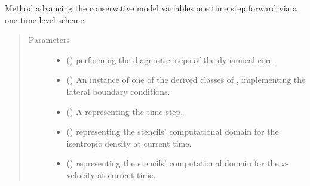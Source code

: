 \documentclass[letterpaper,10pt,english]{sphinxmanual}
\begin{document}
\begin{fulllineitems}
\begin{fulllineitems}
\end{fulllineitems}


\begin{fulllineitems}
\label{\detokenize{api:dycore.prognostic_isentropic.PrognosticIsentropicTL1.step_forward}}
Method advancing the conservative model variables one time step forward via a one-time-level scheme.
\begin{quote}\begin{description}
\item[{Parameters}] \leavevmode\begin{itemize}
\item {} 
 () \textendash{} {\hyperref[\detokenize{api:dycore.diagnostic_isentropic.DiagnosticIsentropic}]{}} performing the diagnostic steps
of the dynamical core.

\item {} 
 () \textendash{} An instance of one of the derived classes of {\hyperref[\detokenize{api:dycore.horizontal_boundary.HorizontalBoundary}]{}},
implementing the lateral boundary conditions.

\item {} 
 () \textendash{} A  representing the time step.

\item {} 
 () \textendash{}  representing the stencils’ computational domain for the isentropic density
at current time.

\item {} 
 () \textendash{}  representing the stencils’ computational domain for the \(x\)-velocity
at current time.


\end{itemize}
\end{description}
\end{quote}
\end{fulllineitems}
\end{fulllineitems}
\end{document}
